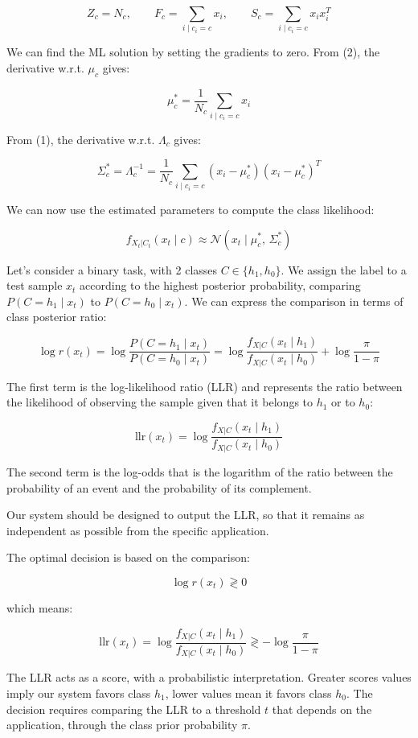 $$Z_c = N_c, \qquad F_c = \sum_{i \mid c_i=c} x_i, \qquad S_c = \sum_{i \mid c_i=c} x_i x_i^T$$

We can find the ML solution by setting the gradients to zero. From (2), the derivative w.r.t. $\mu_c$ gives:

$$\mu_c^* = \frac{1}{N_c} \sum_{i \mid c_i=c} x_i$$

From (1), the derivative w.r.t. $\Lambda_c$ gives:

$$\Sigma_c^* = \Lambda_c^{-1} = \frac{1}{N_c} \sum_{i \mid c_i=c} (x_i - \mu_c^*)(x_i - \mu_c^*)^T$$

We can now use the estimated parameters to compute the class likelihood:

$$f_{X_t|C_t}(x_t \mid c) \approx \mathcal{N}(x_t \mid \mu_c^*,\, \Sigma_c^*)$$

Let's consider a binary task, with 2 classes $C \in \{h_1, h_0\}$.
We assign the label to a test sample $x_t$ according to the highest posterior probability, comparing $P(C = h_1 \mid x_t)$ to $P(C = h_0 \mid x_t)$. We can express the comparison in terms of class posterior ratio:

$$\log r(x_t) = \log \frac{P(C = h_1 \mid x_t)}{P(C = h_0 \mid x_t)} = \log \frac{f_{X|C}(x_t \mid h_1)}{f_{X|C}(x_t \mid h_0)} + \log \frac{\pi}{1 - \pi}$$

The first term is the log-likelihood ratio (LLR) and represents the ratio between the likelihood of observing the sample given that it belongs to $h_1$ or to $h_0$:

$$\mathrm{llr}(x_t) = \log \frac{f_{X|C}(x_t \mid h_1)}{f_{X|C}(x_t \mid h_0)}$$

The second term is the log-odds that is the logarithm of the ratio between the probability of an event and the probability of its complement.

Our system should be designed to output the LLR, so that it remains as independent as possible from the specific application.

The optimal decision is based on the comparison:

$$\log r(x_t) \gtrless 0$$

which means:

$$\mathrm{llr}(x_t) = \log \frac{f_{X|C}(x_t \mid h_1)}{f_{X|C}(x_t \mid h_0)} \gtrless -\log \frac{\pi}{1-\pi}$$

The LLR acts as a score, with a probabilistic interpretation. Greater scores values imply our system favors class $h_1$, lower values mean it favors class $h_0$. The decision requires comparing the LLR to a threshold $t$ that depends on the application, through the class prior probability $\pi$.

